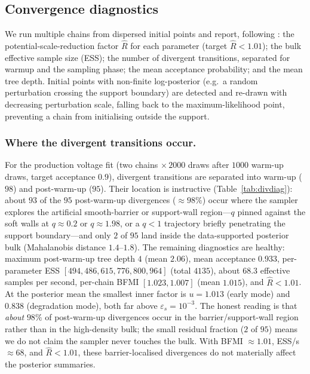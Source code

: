 \documentclass[ASNA,twocolumn]{USG}
\begin{document}
\subsection{Convergence diagnostics}\label{sec:diag}
We run multiple chains from dispersed initial points and report, following
\cite{vehtari2021}: the
potential-scale-reduction factor $\hat R$ for each parameter (target
$\hat R<1.01$); the bulk effective sample size (ESS); the number of
divergent transitions, separated for warmup and the sampling phase; the
mean acceptance probability; and the mean tree depth. Initial points with
non-finite log-posterior (e.g.\ a random perturbation crossing the support
boundary) are detected and re-drawn with decreasing perturbation scale,
falling back to the maximum-likelihood point, preventing a chain from
initialising outside the support.

\subsubsection{Where the divergent transitions occur.}\label{sec:divdiag}
For the production voltage fit (two chains $\times\,2000$ draws after $1000$
warm-up draws, target acceptance $0.9$), divergent transitions are
separated into warm-up ($98$) and post-warm-up ($95$). Their location is
instructive (Table~\ref{tab:divdiag}): about $93$ of the $95$ post-warm-up
divergences ($\approx98\%$) occur where the sampler explores the artificial
smooth-barrier or support-wall region---$q$ pinned against the soft walls at
$q\approx0.2$ or $q\approx1.98$, or a $q<1$ trajectory briefly penetrating
the support boundary---and only $2$ of $95$ land inside the data-supported
posterior bulk (Mahalanobis distance $1.4$--$1.8$). The remaining diagnostics
are healthy: maximum post-warm-up tree depth $4$ (mean $2.06$), mean
acceptance $0.933$, per-parameter ESS $[494,486,615,776,800,964]$ (total
$4135$), about $68.3$ effective samples per second, per-chain BFMI
$[1.023,1.007]$ (mean $1.015$), and $\hat R<1.01$. At the posterior mean the
smallest inner factor is $u=1.013$ (early mode) and $0.838$ (degradation
mode), both far above $\varepsilon_s=10^{-3}$. The honest reading is that
\emph{about} $98\%$ of post-warm-up divergences occur in the barrier/support-wall
region rather than in the high-density bulk; the small residual fraction
($2$ of $95$) means we do not claim the sampler never touches the bulk.
With BFMI $\approx1.01$, ESS/s $\approx68$, and $\hat R<1.01$, these
barrier-localised divergences do not materially affect the posterior
summaries.
\end{document}
